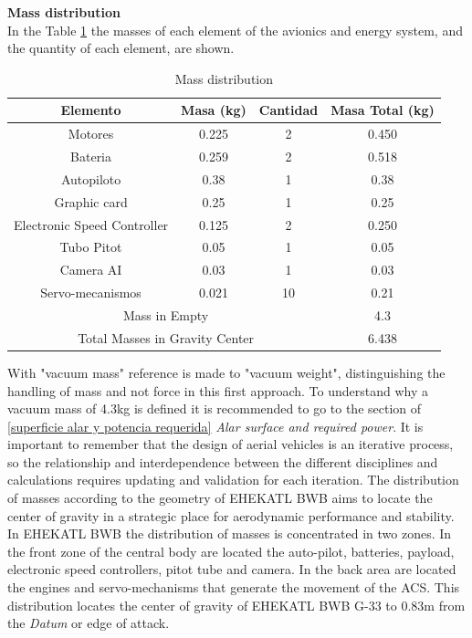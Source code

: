 \textbf{Mass distribution}\\ 
In the Table \ref{Distribucion de masas} the masses of each element of the avionics and energy system, and the quantity of each element, are shown. 
\begin{table}[!h]
    \centering
    \caption{Mass distribution}
    \begin{tabular}{|c|c|c|c|}
    \hline
    \textbf{Elemento} & \textbf{Masa (kg)} & \textbf{Cantidad} & \textbf{Masa Total (kg)} \\
    \hline
    Motores & 0.225 & 2 & 0.450 \\ 
    Bateria & 0.259 & 2  & 0.518 \\
    Autopiloto & 0.38 & 1 & 0.38 \\
    Graphic card & 0.25 & 1 & 0.25 \\
    Electronic Speed Controller & 0.125 & 2 & 0.250 \\
    Tubo Pitot & 0.05 & 1 & 0.05 \\
    Camera AI & 0.03 & 1 & 0.03 \\
    Servo-mecanismos & 0.021 & 10 & 0.21 \\
    \hline
    \multicolumn{3}{|c|}{ Mass in Empty} & 4.3\\
    \hline
    \multicolumn{3}{|c|}{Total Masses in Gravity Center} & 6.438\\
    \hline
    \end{tabular}
    \label{Distribucion de masas}
\end{table}
With "vacuum mass" reference is made to "vacuum weight", distinguishing the handling of mass and not force in this first approach. To understand why a vacuum mass of 4.3kg is defined it is recommended to go to the section of \ref{superficie alar y potencia requerida} \textit{Alar surface and required power}. It is important to remember that the design of aerial vehicles is an iterative process, so the relationship and interdependence between the different disciplines and calculations requires updating and validation for each iteration. The distribution of masses according to the geometry of EHEKATL BWB aims to locate the center of gravity in a strategic place for aerodynamic performance and stability. In EHEKATL BWB the distribution of masses is concentrated in two zones. In the front zone of the central body are located the auto-pilot, batteries, payload, electronic speed controllers, pitot tube and camera. In the back area are located the engines and servo-mechanisms that generate the movement of the ACS. This distribution locates the center of gravity of EHEKATL BWB G-33 to 0.83m from the \textit{Datum} or edge of attack. 


